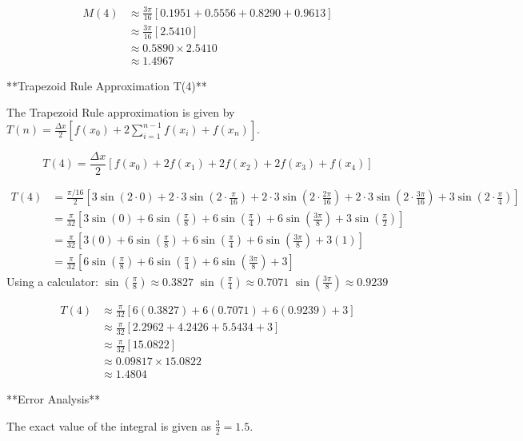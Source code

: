 \documentclass{article}
\begin{document}
\begin{align*} M(4) &\approx \frac{3\pi}{16} [0.1951 + 0.5556 + 0.8290 + 0.9613] \\ &\approx \frac{3\pi}{16} [2.5410] \\ &\approx 0.5890 \times 2.5410 \\ &\approx 1.4967\end{align*}

**Trapezoid Rule Approximation T(4)**

The Trapezoid Rule approximation is given by $T(n) = \frac{\Delta x}{2} [f(x_0) + 2\sum_{i=1}^{n-1} f(x_i) + f(x_n)]$.

$$
T(4) = \frac{\Delta x}{2} [f(x_0) + 2f(x_1) + 2f(x_2) + 2f(x_3) + f(x_4)]
$$

\begin{align*} T(4) &= \frac{\pi/16}{2} \left[ 3\sin\left(2 \cdot 0\right) + 2 \cdot 3\sin\left(2 \cdot \frac{\pi}{16}\right) + 2 \cdot 3\sin\left(2 \cdot \frac{2\pi}{16}\right) + 2 \cdot 3\sin\left(2 \cdot \frac{3\pi}{16}\right) + 3\sin\left(2 \cdot \frac{\pi}{4}\right) \right] \\ &= \frac{\pi}{32} \left[ 3\sin(0) + 6\sin\left(\frac{\pi}{8}\right) + 6\sin\left(\frac{\pi}{4}\right) + 6\sin\left(\frac{3\pi}{8}\right) + 3\sin\left(\frac{\pi}{2}\right) \right] \\ &= \frac{\pi}{32} \left[ 3(0) + 6\sin\left(\frac{\pi}{8}\right) + 6\sin\left(\frac{\pi}{4}\right) + 6\sin\left(\frac{3\pi}{8}\right) + 3(1) \right] \\ &= \frac{\pi}{32} \left[ 6\sin\left(\frac{\pi}{8}\right) + 6\sin\left(\frac{\pi}{4}\right) + 6\sin\left(\frac{3\pi}{8}\right) + 3 \right]\end{align*}
Using a calculator:
$\sin(\frac{\pi}{8}) \approx 0.3827$
$\sin(\frac{\pi}{4}) \approx 0.7071$
$\sin(\frac{3\pi}{8}) \approx 0.9239$

\begin{align*} T(4) &\approx \frac{\pi}{32} [6(0.3827) + 6(0.7071) + 6(0.9239) + 3] \\ &\approx \frac{\pi}{32} [2.2962 + 4.2426 + 5.5434 + 3] \\ &\approx \frac{\pi}{32} [15.0822] \\ &\approx 0.09817 \times 15.0822 \\ &\approx 1.4804\end{align*}

**Error Analysis**

The exact value of the integral is given as $\frac{3}{2} = 1.5$.
\end{document}
